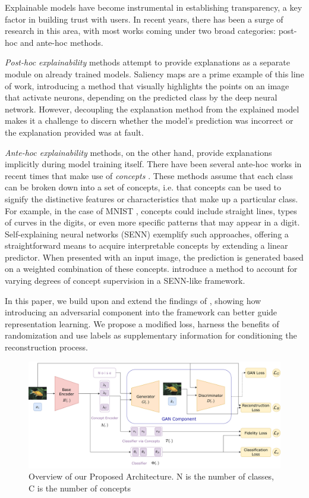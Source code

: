 \documentclass[letterpaper]{article}
\begin{document}
Explainable models have become instrumental in establishing transparency, a key factor in building trust with users. 
In recent years, there has been a surge of research in this area, with most works coming under two broad categories: post-hoc and ante-hoc methods.

\textit{Post-hoc explainability} methods attempt to provide explanations as a separate module on already trained models.
Saliency maps \cite{saliency_maps} are a prime example of this line of work, introducing a method that visually highlights the points on an image that activate neurons, depending on the predicted class by the deep neural network.  However, decoupling the explanation method from the explained model makes it a challenge to discern whether the model's prediction was incorrect or the explanation provided was at fault.

\textit{Ante-hoc explainability} methods, on the other hand, provide explanations implicitly during model training itself. There have been several ante-hoc works in recent times that make use of \textit{concepts} \cite{CBM, efros, efros2}. These methods assume that each class can be broken down into a set of concepts, i.e. that concepts can be used to signify the distinctive features or characteristics that make up a particular class. For example, in the case of MNIST \cite{MNSIT}, concepts could include straight lines, types of curves in the digits, or even more specific patterns that may appear in a digit. 
Self-explaining neural networks (SENN) \cite{SENN} exemplify such approaches, offering a straightforward means to acquire interpretable concepts by extending a linear predictor. When presented with an input image, the prediction is generated based on a weighted combination of these concepts. 
\cite{Sarkar2021AFF} introduce a method to account for varying degrees of concept supervision in a SENN-like framework. 


In this paper, we build upon and extend the findings of \cite{Sarkar2021AFF}, showing how introducing an adversarial component into the framework can better guide representation learning. We propose a modified loss, harness the benefits of randomization and use labels as supplementary information for conditioning the reconstruction process.

\begin{figure}[h!]
    \centering
\includegraphics[width=1.8\columnwidth]{images/senndiag.png}
    \caption{Overview of our Proposed Architecture. N is the number of classes, C is the number of concepts}
    \label{fig:senn_gan}
\end{figure}
\end{document}
